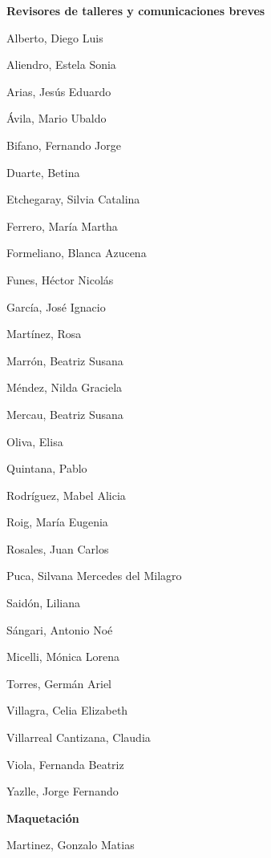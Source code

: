 \begin{center}
	\sffamily \Large \bfseries Revisores de talleres y comunicaciones breves
	
	\vspace*{-1em}
	
	\begin{multicols}{2}
		\large \normalfont
		Alberto, Diego Luis
		
		Aliendro, Estela Sonia
		
		Arias, Jesús Eduardo
		
		Ávila, Mario Ubaldo
		
		Bifano, Fernando Jorge  
		
		Duarte, Betina
		
		Etchegaray, Silvia Catalina
		
		Ferrero, María Martha 
		
		Formeliano, Blanca Azucena 
		
		Funes, Héctor Nicolás
		
		García, José Ignacio
		
		Martínez, Rosa
		
		Marrón, Beatriz Susana
		
		Méndez, Nilda Graciela
		
		Mercau, Beatriz Susana
		
		Oliva, Elisa
		
		Quintana, Pablo
		
		Rodríguez, Mabel Alicia
		
		Roig, María Eugenia 
		
		Rosales, Juan Carlos
		
		Puca, Silvana Mercedes del Milagro 
		
		Saidón, Liliana
		
		Sángari, Antonio Noé 
		
		Micelli, Mónica Lorena
		
		Torres, Germán Ariel
		
		Villagra, Celia Elizabeth
		
		Villarreal Cantizana, Claudia
		
		Viola, Fernanda Beatriz 
		
		Yazlle, Jorge Fernando
	\end{multicols} 
\end{center}

\begin{center}
	\sffamily \Large \bfseries Maquetación
	
	\large \normalfont
	Martinez, Gonzalo Matias
\end{center}

